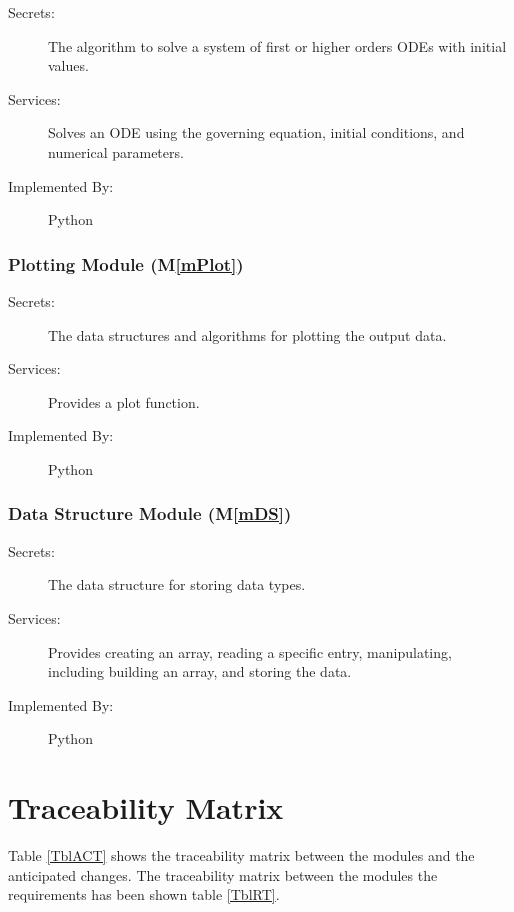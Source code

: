 \documentclass[12pt, titlepage]{article}
\newcommand{\mref}[1]{M\ref{#1}}
\begin{document}
\begin{description}
\item[Secrets:] The algorithm to solve a system of first or higher orders ODEs with initial values.
\item[Services:] Solves an ODE using the governing equation, initial conditions, and numerical parameters.
\item[Implemented By:] Python
\end{description}

\subsubsection{Plotting Module (\mref{mPlot})}

\begin{description}
\item[Secrets:] The data structures and algorithms for plotting the output data.
\item[Services:] Provides a plot function.
\item[Implemented By:] Python
\end{description}

\subsubsection{ Data Structure Module (\mref{mDS})}

\begin{description}
\item[Secrets:] The data structure for storing data types.
\item[Services:] Provides creating an array, reading a specific entry, manipulating, including building an array, and storing the data.
\item[Implemented By:] Python
\end{description}

\section{Traceability Matrix} \label{SecTM}

Table \ref{TblACT} shows the traceability matrix between the modules and the anticipated changes.
The traceability matrix between the modules the
requirements has been shown table \ref{TblRT}.

\end{document}
